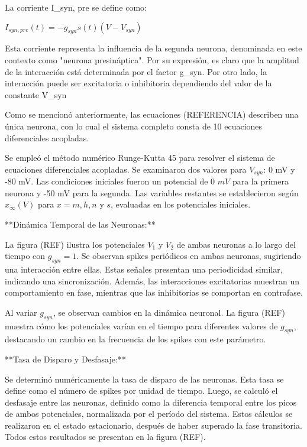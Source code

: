 \documentclass[aps,prb,twocolumn,superscriptaddress,floatfix,longbibliography]{revtex4-2}
\newcounter{para}
\begin{document}
La corriente I_{syn, pre} se define como:

$I_{syn, pre}(t) = -g_{syn} s(t) (V - V_{syn})$

Esta corriente representa la influencia de la segunda neurona, denominada en este contexto como "neurona presináptica". Por su expresión, es claro que la amplitud de la interacción está determinada por el factor g_{syn}. Por otro lado, la interacción puede ser excitatoria o inhibitoria dependiendo del valor de la constante V_{syn}

Como se mencionó anteriormente, las ecuaciones (REFERENCIA) describen una única neurona, con lo cual el sistema completo consta de 10 ecuaciones diferenciales acopladas.

Se empleó el método numérico Runge-Kutta 45 para resolver el sistema de ecuaciones diferenciales acopladas. Se examinaron dos valores para \(V_{syn}\): 0 mV y -80 mV. Las condiciones iniciales fueron un potencial de 0 \(mV\) para la primera neurona y -50 mV para la segunda. Las variables restantes se establecieron según \(x_\infty(V)\) para \(x = m, h, n\) y \(s\), evaluadas en los potenciales iniciales.

**Dinámica Temporal de las Neuronas:**

La figura (REF) ilustra los potenciales \(V_1\) y \(V_2\) de ambas neuronas a lo largo del tiempo con \(g_{syn} = 1\). Se observan spikes periódicos en ambas neuronas, sugiriendo una interacción entre ellas. Estas señales presentan una periodicidad similar, indicando una sincronización. Además, las interacciones excitatorias muestran un comportamiento en fase, mientras que las inhibitorias se comportan en contrafase.

Al variar \(g_{syn}\), se observan cambios en la dinámica neuronal. La figura (REF) muestra cómo los potenciales varían en el tiempo para diferentes valores de \(g_{syn}\), destacando un cambio en la frecuencia de los spikes con este parámetro.

**Tasa de Disparo y Desfasaje:**

Se determinó numéricamente la tasa de disparo de las neuronas. Esta tasa se define como el número de spikes por unidad de tiempo. Luego, se calculó el desfasaje entre las neuronas, definido como la diferencia temporal entre los picos de ambos potenciales, normalizada por el período del sistema. Estos cálculos se realizaron en el estado estacionario, después de haber superado la fase transitoria. Todos estos resultados se presentan en la figura (REF).
\end{document}
